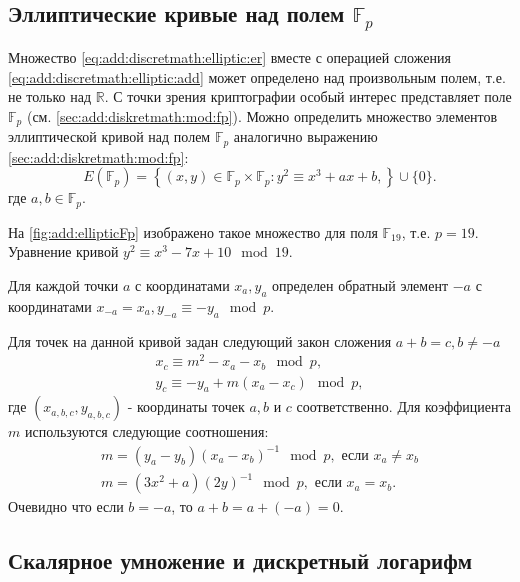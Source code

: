 \subsection{Эллиптические кривые над полем $\mathbb{F}_p$}
Множество \eqref{eq:add:discretmath:elliptic:er} вместе с операцией
сложения \eqref{eq:add:discretmath:elliptic:add} может определено над
произвольным полем, т.е. не только над $\mathbb{R}$. С точки зрения
криптографии особый интерес представляет поле $\mathbb{F}_p$ (см.
\autoref{sec:add:diskretmath:mod:fp}). Можно определить множество
элементов эллиптической кривой над полем $\mathbb{F}_p$ аналогично
выражению \eqref{sec:add:diskretmath:mod:fp}:
\begin{equation}
E\left(\mathbb{F}_p\right) = \left\{ (x,y) \in 
\mathbb{F}_p \times \mathbb{F}_p: 
y^2 \equiv x^3 +ax +b, 
\right\} \cup \{0\}.
\label{eq:add:discretmath:elliptic:fp}
\end{equation}
где $a,b \in \mathbb{F}_p$.



На \autoref{fig:add:ellipticFp} изображено такое множество для поля
$\mathbb{F}_{19}$, т.е. $p = 19$. Уравнение кривой $y^2 \equiv x^3 -7
x + 10 \mod 19$. 

Для каждой точки $a$ с координатами $x_a, y_a$ определен обратный
элемент $-a$ с координатами $x_{-a} = x_a, y_{-a} \equiv -y_a \mod p$.

Для точек на данной кривой задан следующий закон сложения $a + b = c,
b \ne -a$
\begin{eqnarray}
x_{c} \equiv m^2 - x_a - x_b \mod p,
\nonumber \\
y_{c} \equiv - y_a + m \left(x_a - x_c\right) \mod p,
\label{eq:add:discretmath:elliptic:addfp}
\end{eqnarray}
где $(x_{a,b,c}, y_{a,b,c})$ - координаты точек $a,b$ и $c$
соответственно. Для коэффициента $m$ используются следующие
соотношения: 
\begin{eqnarray}
m = \left(y_a - y_b\right)\left(x_a - x_b\right)^{-1} \mod p, \mbox{ если } x_a \ne x_b
\nonumber \\
m = \left(3x^2 + a\right)\left(2y\right)^{-1} \mod p, \mbox{ если }
x_a = x_b.
\nonumber
\end{eqnarray}
Очевидно что если $b = -a$, то $a + b = a + (-a) = 0$.

\subsection{Скалярное умножение и дискретный логарифм}

